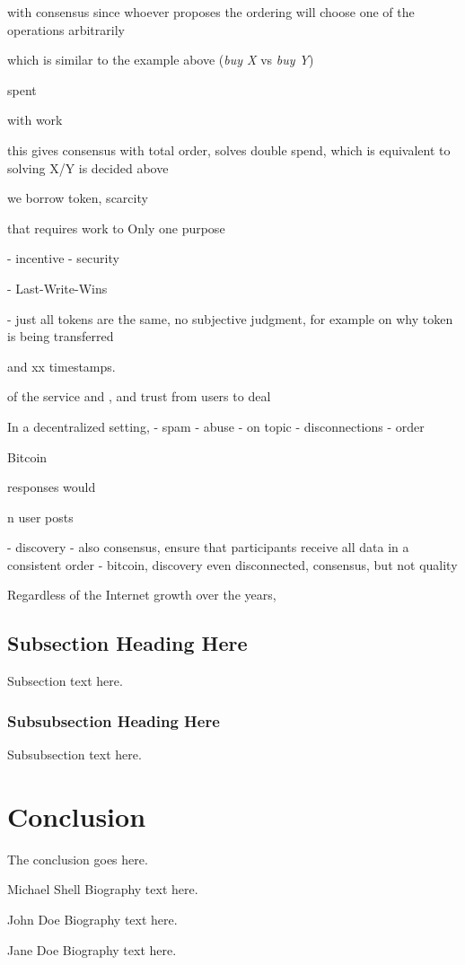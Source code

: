 \documentclass[10pt,journal,compsoc]{IEEEtran}
\begin{document}
 with consensus since
whoever proposes the ordering will choose one of the operations arbitrarily


 which is similar to the
example above (\emph{buy X} vs \emph{buy Y})

spent

with work



this gives consensus with total order, solves double spend, which is equivalent
to solving X/Y is decided above

we borrow token, scarcity


 that requires work to 
Only one purpose


- incentive
- security

- Last-Write-Wins

- just all tokens are the same, no subjective judgment, for example on why token is being transferred


 and xx timestamps.


 of the service and , and trust from users to deal

In a decentralized setting, 
    - spam
    - abuse
    - on topic
    - disconnections
    - order

Bitcoin

responses would




n user posts 

- discovery
- also consensus, ensure that participants receive all data in a consistent order
- bitcoin, discovery even disconnected, consensus, but not quality


Regardless of the Internet growth over the years,

\subsection{Subsection Heading Here}
Subsection text here.

\subsubsection{Subsubsection Heading Here}
Subsubsection text here.

\section{Conclusion}
The conclusion goes here.




\begin{IEEEbiography}{Michael Shell}
Biography text here.
\end{IEEEbiography}

\begin{IEEEbiographynophoto}{John Doe}
Biography text here.
\end{IEEEbiographynophoto}

\begin{IEEEbiographynophoto}{Jane Doe}
Biography text here.
\end{IEEEbiographynophoto}
\end{document}
